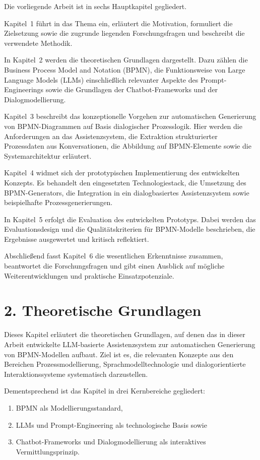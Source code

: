 \documentclass[a4paper,12pt]{scrreprt}
\begin{document}
Die vorliegende Arbeit ist in sechs Hauptkapitel gegliedert.

Kapitel~1 führt in das Thema ein, erläutert die Motivation, formuliert die Zielsetzung sowie die zugrunde liegenden Forschungsfragen und beschreibt die verwendete Methodik.

In Kapitel~2 werden die theoretischen Grundlagen dargestellt. Dazu zählen die Business Process Model and Notation (BPMN), die Funktionsweise von Large Language Models (LLMs) einschließlich relevanter Aspekte des Prompt-Engineerings sowie die Grundlagen der Chatbot-Frameworks und der Dialogmodellierung.

Kapitel~3 beschreibt das konzeptionelle Vorgehen zur automatischen Generierung von BPMN-Diagrammen auf Basis dialogischer Prozesslogik. Hier werden die Anforderungen an das Assistenzsystem, die Extraktion strukturierter Prozessdaten aus Konversationen, die Abbildung auf BPMN-Elemente sowie die Systemarchitektur erläutert.

Kapitel~4 widmet sich der prototypischen Implementierung des entwickelten Konzepts. Es behandelt den eingesetzten Technologiestack, die Umsetzung des BPMN-Generators, die Integration in ein dialogbasiertes Assistenzsystem sowie beispielhafte Prozessgenerierungen.

In Kapitel~5 erfolgt die Evaluation des entwickelten Prototyps. Dabei werden das Evaluationsdesign und die Qualitätskriterien für BPMN-Modelle beschrieben, die Ergebnisse ausgewertet und kritisch reflektiert.

Abschließend fasst Kapitel~6 die wesentlichen Erkenntnisse zusammen, beantwortet die Forschungsfragen und gibt einen Ausblick auf mögliche Weiterentwicklungen und praktische Einsatzpotenziale.

\section*{2. Theoretische Grundlagen}

Dieses Kapitel erläutert die theoretischen Grundlagen, auf denen das in dieser Arbeit entwickelte 
LLM-basierte Assistenzsystem zur automatischen Generierung von BPMN-Modellen aufbaut. 
Ziel ist es, die relevanten Konzepte aus den Bereichen Prozessmodellierung, Sprachmodelltechnologie 
und dialogorientierte Interaktionssysteme systematisch darzustellen. 

Dementsprechend ist das Kapitel in drei Kernbereiche gegliedert:
\begin{enumerate}
	\item \ac{BPMN} als Modellierungsstandard,
	\item \acp{LLM} und Prompt-Engineering als technologische Basis sowie
	\item Chatbot-Frameworks und Dialogmodellierung als interaktives Vermittlungsprinzip.
\end{enumerate}
\end{document}
